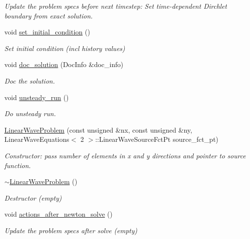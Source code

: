 \begin{DoxyCompactItemize}
\begin{DoxyCompactList}\small\item\em Update the problem specs before next timestep\+: Set time-\/dependent Dirchlet boundary from exact solution. \end{DoxyCompactList}\item 
void \hyperlink{classLinearWaveProblem_afb5d327791d8289a8a0a565afc8aee37}{set\+\_\+initial\+\_\+condition} ()
\begin{DoxyCompactList}\small\item\em Set initial condition (incl history values) \end{DoxyCompactList}\item 
void \hyperlink{classLinearWaveProblem_a6d9396a693be0479ece9ac1f14f9233a}{doc\+\_\+solution} (Doc\+Info \&doc\+\_\+info)
\begin{DoxyCompactList}\small\item\em Doc the solution. \end{DoxyCompactList}\item 
void \hyperlink{classLinearWaveProblem_a9993365201bfffcc04dd2034f0d3d391}{unsteady\+\_\+run} ()
\begin{DoxyCompactList}\small\item\em Do unsteady run. \end{DoxyCompactList}\item 
\hyperlink{classLinearWaveProblem_a8f49994bc293eee5946b79871ee78ea3}{Linear\+Wave\+Problem} (const unsigned \&nx, const unsigned \&ny, Linear\+Wave\+Equations$<$ 2 $>$\+::Linear\+Wave\+Source\+Fct\+Pt source\+\_\+fct\+\_\+pt)
\begin{DoxyCompactList}\small\item\em Constructor\+: pass number of elements in x and y directions and pointer to source function. \end{DoxyCompactList}\item 
\hyperlink{classLinearWaveProblem_af1f3879114813b0acdfd2567c5c7b1e9}{$\sim$\+Linear\+Wave\+Problem} ()
\begin{DoxyCompactList}\small\item\em Destructor (empty) \end{DoxyCompactList}\item 
void \hyperlink{classLinearWaveProblem_a5b45c619af141b19162f990a95490e80}{actions\+\_\+after\+\_\+newton\+\_\+solve} ()
\begin{DoxyCompactList}\small\item\em Update the problem specs after solve (empty) \end{DoxyCompactList}\item 

\end{DoxyCompactItemize}
